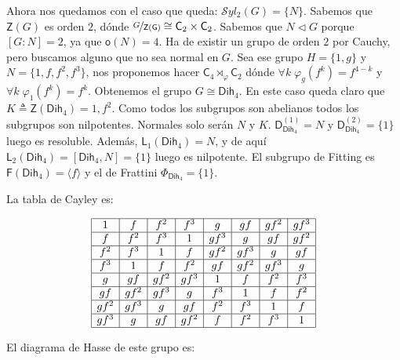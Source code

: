 \documentclass[12pt,a4paper,fleqn,spanish,final,openright]{extbook}
\theoremstyle{definition}
\theoremstyle{remark}
\begin{document}
    Ahora nos quedamos con el caso que queda: $\mathcal{S}yl_2 (G)=\{N\}$. Sabemos que $\mathsf{Z}(G)$ es orden $2$, dónde $\nicefrac{G}{\mathsf{Z}(\mathsf{G})}   \cong    {{\mathsf{C}}_{2}}   \times   {{\mathsf{C}}_{2}}$. Sabemos que $N\lhd G$ porque $[G:N]=2$, ya que $\mathsf{o}(N)=4$. Ha de existir un grupo de orden $2$ por Cauchy, pero buscamos alguno que no sea normal en $G$. Sea ese grupo $H=\{1,g\}$ y $N=\{1,f,f^2,f^3\}$, nos proponemos hacer $\mathsf{C}_{4}\rtimes_{\varphi }\mathsf{C}_{2}$ dónde $\forall k \;\varphi_g (f^k)=f^{4-k}$ y $\forall k\;\varphi_1 (f^k)=f^k$. Obtenemos el grupo $G   \cong   \mathsf{Dih}_{4}$. En este caso queda claro que $K \triangleq\mathsf{Z}\left(\mathsf{Dih}_4\right)={1,f^2}$. Como todos los subgrupos son abelianos todos los subgrupos son nilpotentes. Normales solo serán $N$ y $K$. ${\mathsf{D}}_{\mathsf{Dih}_4}^{(1)} = N$ y ${\mathsf{D}}_{\mathsf{Dih}_4}^{(2)} = \{1\}$ luego es resoluble. Además, $\mathsf{L}_{1}(\mathsf{Dih}_4)=N$, y de aquí $\mathsf{L}_{2}(\mathsf{Dih}_4)=\left[\mathsf{Dih}_4,N\right]=\{1\}$ luego es nilpotente. El subgrupo de Fitting es $\mathsf{F}(\mathsf{Dih}_4)=\langle f\rangle$ y el de Frattini $\Phi_{\mathsf{Dih}_4} = \{1\}$.

    La tabla de Cayley es:

\begin{align*}
\begin{array}{|c|c|c|c|c|c|c|c|}
\hline
1&f&f^2&f^3&g&gf&gf^2&gf^3\\
\hline
f&f^2&f^3&1&gf^3&g&gf&gf^2\\
\hline
f^2&f^3&1&f&gf^2&gf^3&g&gf\\
\hline
f^3&1&f&f^2&gf&gf^2&gf^3&g\\
\hline
g&gf&gf^2&gf^3&1&f&f^2&f^3\\
\hline
gf&gf^2&gf^3&g&f^3&1&f&f^2\\
\hline
gf^2&gf^3&g&gf&f^2&f^3&1&f\\
\hline
gf^3&g&gf&gf^2&f&f^2&f^3&1\\
\hline
\end{array}
\end{align*}

    El diagrama de Hasse de este grupo es:
\end{document}
